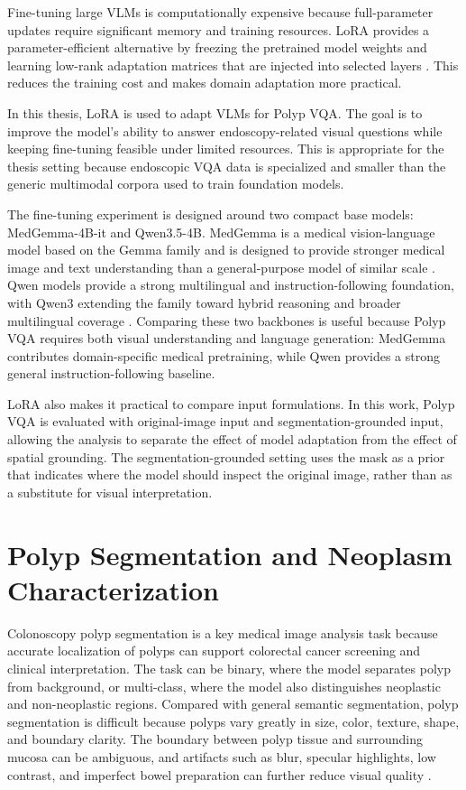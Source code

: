 Fine-tuning large VLMs is computationally expensive because full-parameter updates require significant memory and training resources. LoRA provides a parameter-efficient alternative by freezing the pretrained model weights and learning low-rank adaptation matrices that are injected into selected layers \cite{lora}. This reduces the training cost and makes domain adaptation more practical.

In this thesis, LoRA is used to adapt VLMs for Polyp VQA. The goal is to improve the model's ability to answer endoscopy-related visual questions while keeping fine-tuning feasible under limited resources. This is appropriate for the thesis setting because endoscopic VQA data is specialized and smaller than the generic multimodal corpora used to train foundation models.

The fine-tuning experiment is designed around two compact base models: MedGemma-4B-it and Qwen3.5-4B. MedGemma is a medical vision-language model based on the Gemma family and is designed to provide stronger medical image and text understanding than a general-purpose model of similar scale \cite{medgemma_report}. Qwen models provide a strong multilingual and instruction-following foundation, with Qwen3 extending the family toward hybrid reasoning and broader multilingual coverage \cite{qwen3_report}. Comparing these two backbones is useful because Polyp VQA requires both visual understanding and language generation: MedGemma contributes domain-specific medical pretraining, while Qwen provides a strong general instruction-following baseline.

LoRA also makes it practical to compare input formulations. In this work, Polyp VQA is evaluated with original-image input and segmentation-grounded input, allowing the analysis to separate the effect of model adaptation from the effect of spatial grounding. The segmentation-grounded setting uses the mask as a prior that indicates where the model should inspect the original image, rather than as a substitute for visual interpretation.

\section{Polyp Segmentation and Neoplasm Characterization}

Colonoscopy polyp segmentation is a key medical image analysis task because accurate localization of polyps can support colorectal cancer screening and clinical interpretation. The task can be binary, where the model separates polyp from background, or multi-class, where the model also distinguishes neoplastic and non-neoplastic regions. Compared with general semantic segmentation, polyp segmentation is difficult because polyps vary greatly in size, color, texture, shape, and boundary clarity. The boundary between polyp tissue and surrounding mucosa can be ambiguous, and artifacts such as blur, specular highlights, low contrast, and imperfect bowel preparation can further reduce visual quality \cite{pranet}.


